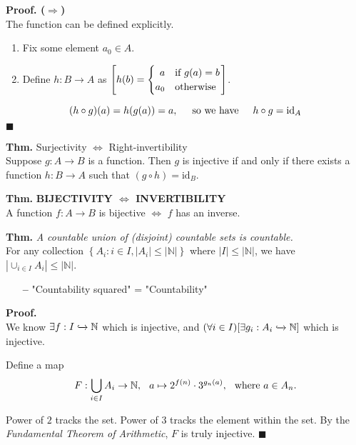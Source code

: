 \documentclass{article}
\newenvironment{theorem}[2][Thm.]
    { \begin{mdframed}[backgroundcolor=blue!10] \textbf{#1} {#2} \vspace{0.2cm}\\}
    {  \end{mdframed}}
\newenvironment{prf}[2][Proof.]
    { \begin{mdframed}[] \textbf{#1 #2} \\}
    {  \end{mdframed}}
\newcommand{\N}{\mathbb{N}}
\newcommand{\union}{\cup}
\newcommand{\ep}{\hfill $\blacksquare$\nl}
\begin{document}
    \begin{prf}{($\Longrightarrow$)}
        The function can be defined explicitly.
        \begin{enumerate}
            \item Fix some element $a_0 \in A$.
            \item Define $h: B\to A$ as
            $\left[h(b) = \begin{cases}
                \hfill
                a & \text{if $g(a) = b$}\\
                a_0 & \text{otherwise}
            \end{cases}\right]$.
        \end{enumerate}
        \[(h\circ g)(a) = h(g(a)) = a, \hspace{0,5cm}\text{so we have}\hspace{0,5cm} h\circ g = \text{id}_A\]\ep
    \end{prf}
    
    \begin{theorem}{Surjectivity $\Leftrightarrow$ Right-invertibility}
        Suppose $g: A\to B$ is a function. Then $g$ is injective if and only if there exists a function $h: B\to A$ such that $(g\circ h) = \text{id}_B$.
    \end{theorem}
    
    \begin{theorem}{\textbf{BIJECTIVITY $\Leftrightarrow$ INVERTIBILITY}}
        A function $f: A \to B$ is bijective $\Leftrightarrow$ $f$ has an inverse.
    \end{theorem}
    
    \clearpage
    
    \begin{theorem}{\textit{A countable union of (disjoint) countable sets is countable.}}
        For any collection $\left\{A_i: i \in I, |A_i| \le |\N|\right\}$ where $|I| \le |\N|$, we have $|\union_{i\in I} A_i| \le |\N|$.
        
        \begin{itemize}
            \item[\textbf{--}] "Countability squared" = "Countability"
        \end{itemize}
    \end{theorem}
    \begin{prf}{}
        We know $\exists f: I \xhookrightarrow{} \N$ which is injective, and $(\forall i \in I)[\exists g_i: A_i \xhookrightarrow{} \N]$ which is injective. \vspace{0.25cm}
        
        Define a map $$F: \bigcup_{i\in I} A_i \to \N, \hspace{0.25cm} a \mapsto 2^{f(n)}\cdot 3^{g_n(a)}, \hspace{0.25cm} \text{where $a \in A_n$.}$$
        
        Power of $2$ tracks the set. Power of $3$ tracks the element within the set. By the \textit{Fundamental Theorem of Arithmetic}, $F$ is truly injective. \ep
    \end{prf}
    
\end{document}
